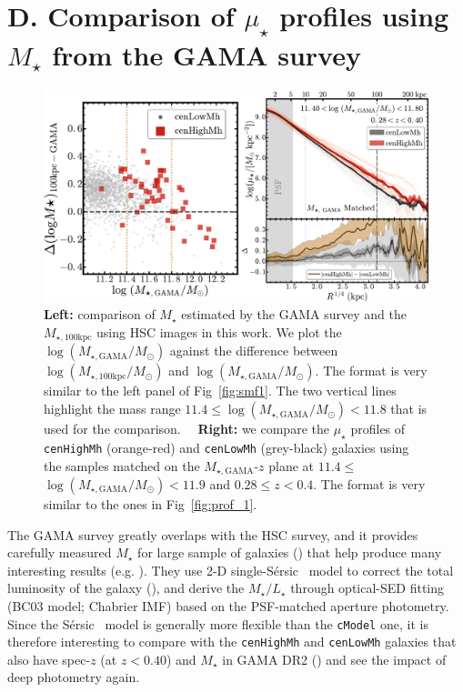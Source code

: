 \documentclass[a4paper,fleqn,usenatbib]{mnras}
\def\ser{{S\'{e}rsic\ }}
\def\rbcg{\texttt{cenHighMh}}
\def\nbcg{\texttt{cenLowMh}}
\def\mstar{{$M_{\star}$}}
\def\mtot{{$M_{\star,100\mathrm{kpc}}$}}
\def\mgama{{$M_{\star,\mathrm{GAMA}}$}}
\def\logmtot{{$\log (M_{\star,100\mathrm{kpc}}/M_{\odot})$}}
\def\logmgama{{$\log (M_{\star,\mathrm{GAMA}}/M_{\odot})$}}
\def\m2l{{$M_{\star}/L_{\star}$}}
\def\mden{{$\mu_{\star}$}}
\begin{document}
\section{D. Comparison of \mden{} profiles using \mstar{} from the GAMA survey}
    \label{app:gama} 

\begin{figure}
    \centering
    \includegraphics[width=\textwidth]{fig/redbcg_prof_gama_new}
    \caption{
        \textbf{Left:} comparison of \mstar{} estimated by the GAMA survey and 
        the \mtot{} using HSC images in this work. 
        We plot the \logmgama{} against the difference between \logmtot{} and \logmgama{}. 
        The format is very similar to the left panel of Fig~\ref{fig:smf1}. 
        The two vertical lines highlight the mass range $11.4 \leq$\logmgama{}$<11.8$ 
        that is used for the comparison.~~
        \textbf{Right:} we compare the \mden{} profiles of \rbcg{} (orange-red) and 
        \nbcg{} (grey-black) galaxies using the samples matched on the 
        \mgama{}-$z$ plane at $11.4 \leq$\logmgama{}$<11.9$ and $0.28 \leq z < 0.4$. 
        The format is very similar to the ones in Fig~\ref{fig:prof_1}.}
    \label{fig:gama}
\end{figure}

    The GAMA survey greatly overlaps with the HSC survey, and it provides carefully 
    measured \mstar{} for large sample of galaxies (\citealt{Taylor2011}) that help 
    produce many interesting results (e.g. \citealt{Bauer2013, Ferreras2017}).
    They use 2-D single-\ser{} model to correct the total luminosity of the galaxy 
    (\citealt{Kelvin2012}), and derive the \m2l{} through optical-SED fitting 
    (BC03 model; Chabrier IMF) based on the PSF-matched aperture photometry. 
    Since the \ser{} model is generally more flexible than the \texttt{cModel} one, 
    it is therefore interesting to compare with the \rbcg{} and \nbcg{} galaxies 
    that also have spec-$z$ (at $z < 0.40$) and \mstar{} in GAMA DR2 
    (\citealt{Liske2015}) and see the impact of deep photometry again. 
    
\end{document}

